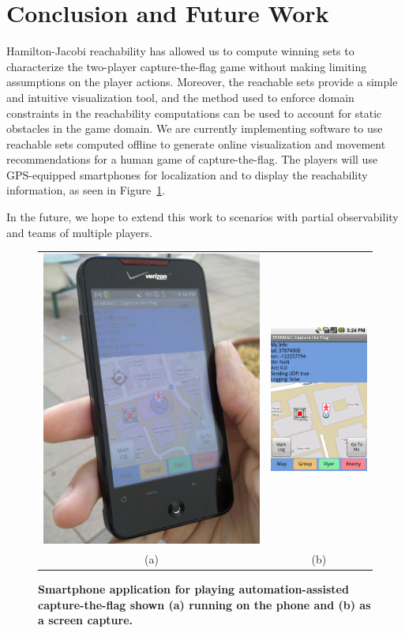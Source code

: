 \documentclass[letterpaper, 10 pt, conference]{ieeeconf}  %
\numberwithin{algorithm}{section}
\begin{document}
\section{Conclusion and Future Work}
\label{sec:conc}
Hamilton-Jacobi reachability has allowed us to compute winning sets to characterize the two-player capture-the-flag game without making limiting assumptions on the player actions.  Moreover, the reachable sets provide a simple and intuitive visualization tool, and the method used to enforce domain constraints in the reachability computations can be used to account for static obstacles in the game domain.  We are currently implementing software to use reachable sets computed offline to generate online visualization and movement recommendations for a human game of capture-the-flag.  The players will use GPS-equipped smartphones for localization and to display the reachability information, as seen in Figure~\ref{fig:phoneGame}.

In the future, we hope to extend this work to scenarios with partial observability and teams of multiple players.  

\begin{figure}[tb]
	\centering
\begin{tabular}{cc}
\includegraphics[width=0.38\linewidth]{figures/starmac_ctf_phone.jpg} & 
\includegraphics[width=0.34\linewidth]{figures/starmac_ctf_pic_emulator.png} \\
(a) & (b) \\
\end{tabular}
\caption{\textbf{Smartphone application for playing automation-assisted capture-the-flag shown (a) running on the phone and (b) as  a screen capture. }}
\label{fig:phoneGame}
\end{figure}
\end{document}
